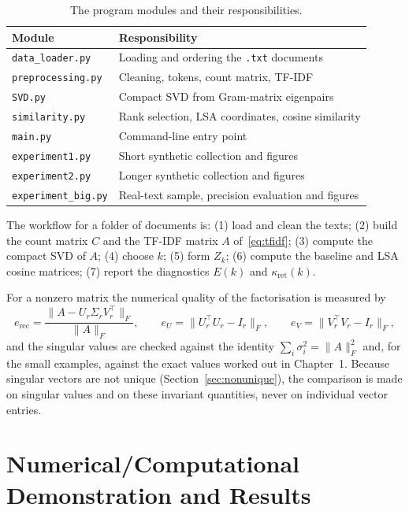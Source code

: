 \documentclass[12pt,a4paper]{report}
\newcommand{\norm}[1]{\lVert #1\rVert}
\newcommand{\T}{^{\top}}
\theoremstyle{plain}
\theoremstyle{definition}
\theoremstyle{remark}
\theoremstyle{definition}
\begin{document}
\begin{table}[H]
\centering
\caption{The program modules and their responsibilities.}\label{tab:modules}
\begin{tabularx}{\textwidth}{@{}lX@{}}
\toprule
Module & Responsibility\\
\midrule
\texttt{data\_loader.py} & Loading and ordering the \texttt{.txt} documents\\
\texttt{preprocessing.py} & Cleaning, tokens, count matrix, TF-IDF\\
\texttt{SVD.py} & Compact SVD from Gram-matrix eigenpairs\\
\texttt{similarity.py} & Rank selection, LSA coordinates, cosine similarity\\
\texttt{main.py} & Command-line entry point\\
\texttt{experiment1.py} & Short synthetic collection and figures\\
\texttt{experiment2.py} & Longer synthetic collection and figures\\
\texttt{experiment\_big.py} & Real-text sample, precision evaluation and figures\\
\bottomrule
\end{tabularx}
\end{table}

The workflow for a folder of documents is: (1) load and clean the texts; (2) build the count matrix $C$ and the TF-IDF matrix $A$ of~\eqref{eq:tfidf}; (3) compute the compact SVD of $A$; (4) choose $k$; (5) form $Z_k$; (6) compute the baseline and LSA cosine matrices; (7) report the diagnostics $E(k)$ and $\kappa_{\mathrm{ret}}(k)$.

For a nonzero matrix the numerical quality of the factorisation is measured by
\[
e_{\mathrm{rec}}=\frac{\norm{A-U_r\Sigma_rV_r\T}_F}{\norm{A}_F},\qquad
e_U=\norm{U_r\T U_r-I_r}_F,\qquad
e_V=\norm{V_r\T V_r-I_r}_F ,
\]
and the singular values are checked against the identity $\sum_i\sigma_i^2=\norm{A}_F^2$ and, for the small examples, against the exact values worked out in Chapter~1. Because singular vectors are not unique (Section~\ref{sec:nonunique}), the comparison is made on singular values and on these invariant quantities, never on individual vector entries.

\section{Numerical/Computational Demonstration and Results}\label{sec:results}
\end{document}
